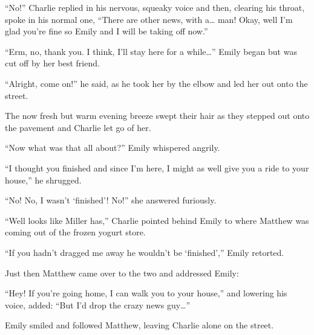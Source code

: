 “No!” Charlie replied in his nervous, squeaky voice and then, clearing his throat, spoke in his normal one, “There are other news, with a… man! Okay, well I’m glad you’re fine so Emily and I will be taking off now.”

“Erm, no, thank you. I think, I’ll stay here for a while…” Emily began but was cut off by her best friend.

“Alright, come on!” he said, as he took her by the elbow and led her out onto the street.

The now fresh but warm evening breeze swept their hair as they stepped out onto the pavement and Charlie let go of her.

“Now what was that all about?” Emily whispered angrily.

“I thought you finished and since I’m here, I might as well give you a ride to your house,” he shrugged.

“No! No, I wasn’t ‘finished’! No!” she answered furiously.

“Well looks like Miller has,” Charlie pointed behind Emily to where Matthew was coming out of the frozen yogurt store.

“If you hadn’t dragged me away he wouldn’t be ‘finished’,” Emily retorted.

Just then Matthew came over to the two and addressed Emily:

“Hey! If you’re going home, I can walk you to your house,” and lowering his voice, added: “But I’d drop the crazy news guy…”

Emily smiled and followed Matthew, leaving Charlie alone on the street.